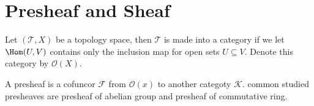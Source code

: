 
\section{Presheaf and Sheaf}
Let $(\mathcal T, X)$ be a topology space, then $\mathcal T$ is made
into a category if we let $\Hom(U, V)$ contains only the inclusion map
for open sets $U \subseteq V$. Denote this category by $\mathcal O(X)$.

A presheaf is a cofuncor $\mathcal F$ from $\mathcal O(x)$ to another categoty $\mathcal K$.
common studied presheaves are presheaf of abelian group and presheaf of commutative ring.
